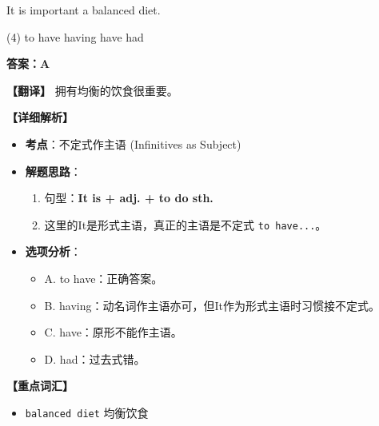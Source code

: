 \documentclass[11pt, a4paper]{article}
\newcommand{\analysis}[4]{
    \begin{solutionbox}
        \textbf{答案：#1}
        
        \textbf{【翻译】} #2
        
        \textbf{【详细解析】}
        #3
        
        \textbf{【重点词汇】}
        #4
    \end{solutionbox}
}
\newcommand{\blank}{\underline{\hspace{1.5cm}}}
\begin{document}
\begin{questions}
    \item It is important \blank a balanced diet.
    \begin{tasks}(4)
        \task to have \task having \task have \task had
    \end{tasks}
    \analysis{A}{拥有均衡的饮食很重要。}{
        \begin{itemize}
            \item \textbf{考点}：不定式作主语 (Infinitives as Subject)
            \item \textbf{解题思路}：
                \begin{enumerate}
                    \item 句型：\textbf{It is + adj. + to do sth.}
                    \item 这里的It是形式主语，真正的主语是不定式 \texttt{to have...}。
                \end{enumerate}
            \item \textbf{选项分析}：
                \begin{itemize}
                    \item A. to have：正确答案。
                    \item B. having：动名词作主语亦可，但It作为形式主语时习惯接不定式。
                    \item C. have：原形不能作主语。
                    \item D. had：过去式错。
                \end{itemize}
        \end{itemize}
    }{
        \begin{itemize}
            \item \texttt{balanced diet} 均衡饮食
        \end{itemize}
    }


\end{questions}
\end{document}
